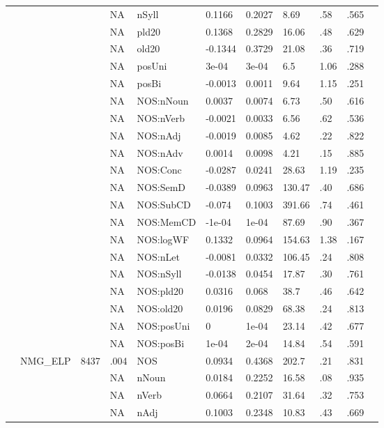 \begin{table}[ht]
\begin{tabular}{lllllllllll}
   &  &  & NA & nSyll & 0.1166 & 0.2027 & 8.69 & .58 & .565 &   \\ 
   &  &  & NA & pld20 & 0.1368 & 0.2829 & 16.06 & .48 & .629 &   \\ 
   &  &  & NA & old20 & -0.1344 & 0.3729 & 21.08 & .36 & .719 &   \\ 
   &  &  & NA & posUni & 3e-04 & 3e-04 & 6.5 & 1.06 & .288 &   \\ 
   &  &  & NA & posBi & -0.0013 & 0.0011 & 9.64 & 1.15 & .251 &   \\ 
   &  &  & NA & NOS:nNoun & 0.0037 & 0.0074 & 6.73 & .50 & .616 &   \\ 
   &  &  & NA & NOS:nVerb & -0.0021 & 0.0033 & 6.56 & .62 & .536 &   \\ 
   &  &  & NA & NOS:nAdj & -0.0019 & 0.0085 & 4.62 & .22 & .822 &   \\ 
   &  &  & NA & NOS:nAdv & 0.0014 & 0.0098 & 4.21 & .15 & .885 &   \\ 
   &  &  & NA & NOS:Conc & -0.0287 & 0.0241 & 28.63 & 1.19 & .235 &   \\ 
   &  &  & NA & NOS:SemD & -0.0389 & 0.0963 & 130.47 & .40 & .686 &   \\ 
   &  &  & NA & NOS:SubCD & -0.074 & 0.1003 & 391.66 & .74 & .461 &   \\ 
   &  &  & NA & NOS:MemCD & -1e-04 & 1e-04 & 87.69 & .90 & .367 &   \\ 
   &  &  & NA & NOS:logWF & 0.1332 & 0.0964 & 154.63 & 1.38 & .167 &   \\ 
   &  &  & NA & NOS:nLet & -0.0081 & 0.0332 & 106.45 & .24 & .808 &   \\ 
   &  &  & NA & NOS:nSyll & -0.0138 & 0.0454 & 17.87 & .30 & .761 &   \\ 
   &  &  & NA & NOS:pld20 & 0.0316 & 0.068 & 38.7 & .46 & .642 &   \\ 
   &  &  & NA & NOS:old20 & 0.0196 & 0.0829 & 68.38 & .24 & .813 &   \\ 
   &  &  & NA & NOS:posUni & 0 & 1e-04 & 23.14 & .42 & .677 &   \\ 
   &  &  & NA & NOS:posBi & 1e-04 & 2e-04 & 14.84 & .54 & .591 &   \\ 
   & NMG\_ELP & 8437 & .004 & NOS & 0.0934 & 0.4368 & 202.7 & .21 & .831 &   \\ 
   &  &  & NA & nNoun & 0.0184 & 0.2252 & 16.58 & .08 & .935 &   \\ 
   &  &  & NA & nVerb & 0.0664 & 0.2107 & 31.64 & .32 & .753 &   \\ 
   &  &  & NA & nAdj & 0.1003 & 0.2348 & 10.83 & .43 & .669 &   \\ 

\end{tabular}
\end{table}
